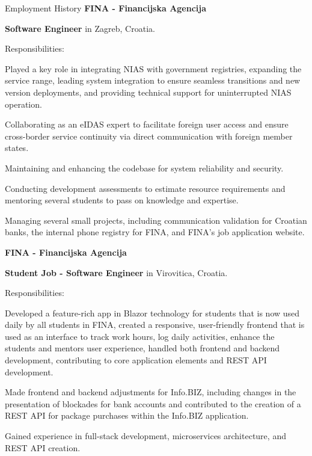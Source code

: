 \begin{rubric}{Employment History}
	\textbf{FINA - Financijska Agencija} \par
	\textbf{Software Engineer} in Zagreb, Croatia.
	\par Responsibilities:
	\begin{list}{}{\leftmargin=0pt \itemindent=1em}
		\item Played a key role in integrating NIAS with government registries, expanding the service range, leading system integration to ensure seamless transitions and new version deployments, and providing technical support for uninterrupted NIAS operation.
		\item Collaborating as an eIDAS expert to facilitate foreign user access and ensure cross-border service continuity via direct communication with foreign member states.
		\item Maintaining and enhancing the codebase for system reliability and security.
		\item Conducting development assessments to estimate resource requirements and mentoring several students to pass on knowledge and expertise.
		\item Managing several small projects, including communication validation for Croatian banks, the internal phone registry for FINA, and FINA's job application website.
	\end{list}
	\textbf{FINA - Financijska Agencija} \par
	\textbf{Student Job - Software Engineer} in Virovitica, Croatia.
	\par Responsibilities:
	\begin{list}{}{\leftmargin=0pt \itemindent=1em}
		\item Developed a feature-rich app in Blazor technology for students that is now used daily by all students in FINA, created a responsive, user-friendly frontend that is used as an interface to track work hours, log daily activities, enhance the students and mentors user experience, handled both frontend and backend development, contributing to core application elements and REST API development.
		\item Made frontend and backend adjustments for Info.BIZ, including changes in the presentation of blockades for bank accounts and contributed to the creation of a REST API for package purchases within the Info.BIZ application.
		\item Gained experience in full-stack development, microservices architecture, and REST API creation.
	\end{list}
\end{rubric}
